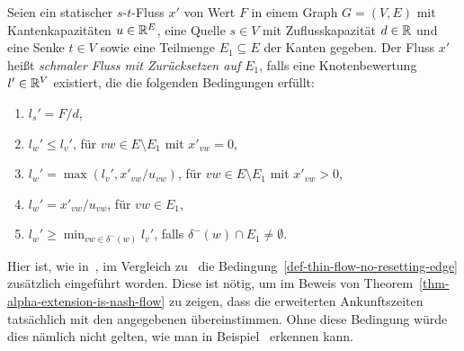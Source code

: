 \begin{definition}\label{def-thin-flow}
	Seien ein statischer $s$-$t$-Fluss $x'$ von Wert $F$ in einem Graph $G=(V,E)$ mit Kantenkapazitäten $u\in\mathbb{R}^E$, eine Quelle $s\in V$ mit Zuflusskapazität $d\in\mathbb{R}$ und eine Senke $t\in V$ sowie eine Teilmenge $E_1\subseteq E$ der Kanten gegeben.
	Der Fluss $x'$ heißt \emph{schmaler Fluss mit Zurücksetzen auf $E_1$}, falls eine Knotenbewertung $l'\in\mathbb{R}^V$ existiert, die die folgenden Bedingungen erfüllt:
	\begin{enumerate}[label=(T\arabic*)]
	\item $l_s' = F/d$,
	\item\label{def-thin-flow-x-zero} $l_w' \leq l_v'$, \tabto{4cm} für $vw\in E \setminus E_1$ mit $x'_{vw}=0$,
	\item\label{def-thin-flow-x-positive} $l_w' = \max(l_v', x'_{vw} / u_{vw} )$,  \tabto{4cm} für $vw\in E\setminus E_1$ mit $x'_{vw} > 0$,
	\item\label{def-thin-flow-resetting-edge} $l_w' = x'_{vw} / u_{vw}$,  \tabto{4cm} für $vw\in E_1$,
	
	\item\label{def-thin-flow-no-resetting-edge} $l_w' \geq \min_{vw\in \delta^-(w)} l_v'$, \tabto{4cm} falls $\delta^-(w)\cap E_1 \neq \emptyset$.
	\end{enumerate}
\end{definition}
\begin{remark}
	Hier ist, wie in~\cite[Definition 4]{Cominetti2011}, im Vergleich zu~\cite[Definition 6]{Koch2011} die Bedingung~\ref{def-thin-flow-no-resetting-edge} zusätzlich eingeführt worden.
	Diese ist nötig, um im Beweis von Theorem~\ref{thm-alpha-extension-is-nash-flow} zu zeigen, dass die erweiterten Ankunftszeiten tatsächlich mit den angegebenen übereinstimmen.
	Ohne diese Bedingung würde dies nämlich nicht gelten, wie man in Beispiel~ erkennen kann.
\end{remark}

